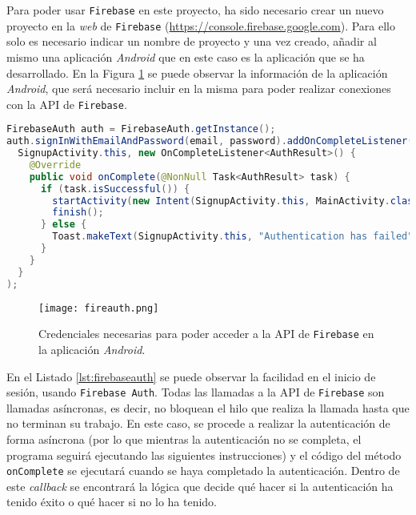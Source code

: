 Para poder usar \texttt{Firebase} en este proyecto, ha sido necesario crear un nuevo proyecto en la \textit{web} de \texttt{Firebase} (\url{https://console.firebase.google.com}). Para ello solo es necesario indicar un nombre de proyecto y una vez creado, añadir al mismo una aplicación \textit{Android} que en este caso es la aplicación que se ha desarrollado. En la Figura \ref{fig:fireauth} se puede observar la información de la aplicación \textit{Android}, que será necesario incluir en la misma para poder realizar conexiones con la \ac{API} de \texttt{Firebase}.	

\begin{lstlisting}[language=java,captionpos=t,caption={\textbf{Inicio de sesión usando \texttt{Firabase Auth}.}},label={lst:firebaseauth}]
FirebaseAuth auth = FirebaseAuth.getInstance();
auth.signInWithEmailAndPassword(email, password).addOnCompleteListener(
  SignupActivity.this, new OnCompleteListener<AuthResult>() {
    @Override
    public void onComplete(@NonNull Task<AuthResult> task) {
      if (task.isSuccessful()) {
        startActivity(new Intent(SignupActivity.this, MainActivity.class));
        finish();
      } else {
        Toast.makeText(SignupActivity.this, "Authentication has failed", Toast.LENGTH_SHORT).show();
      }
    }
  }
);
\end{lstlisting}

\begin{figure}[!h]
\begin{center}
\texttt{[image: fireauth.png]}
\caption{Credenciales necesarias para poder acceder a la \ac{API} de \texttt{Firebase} en la aplicación \textit{Android}.}
\label{fig:fireauth}
\end{center}
\end{figure}

En el Listado \ref{lst:firebaseauth} se puede observar la facilidad en el inicio de sesión, usando \texttt{Firebase Auth}. Todas las llamadas a la \ac{API} de \texttt{Firebase} son llamadas asíncronas, es decir, no bloquean el hilo que realiza la llamada hasta que no terminan su trabajo. En este caso, se procede a realizar la autenticación de forma asíncrona (por lo que mientras la autenticación no se completa, el programa seguirá ejecutando las siguientes instrucciones) y el código del método \texttt{onComplete} se ejecutará cuando se haya completado la autenticación. Dentro de este \textit{callback} se encontrará la lógica que decide qué hacer si la autenticación ha tenido éxito o qué hacer si no lo ha tenido.

